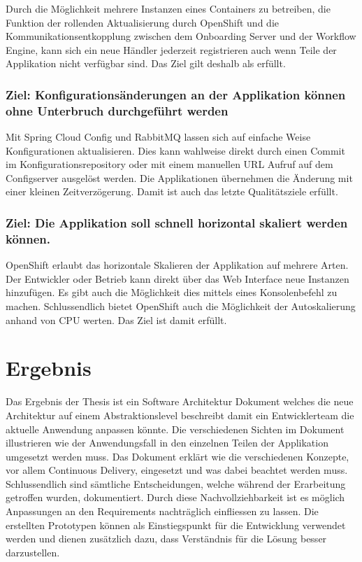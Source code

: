 Durch die Möglichkeit mehrere Instanzen eines Containers zu betreiben, die Funktion der rollenden Aktualisierung durch OpenShift und die Kommunikationsentkopplung zwischen dem Onboarding Server und der Workflow Engine, kann sich ein neue Händler jederzeit registrieren auch wenn Teile
der Applikation nicht verfügbar sind. Das Ziel gilt deshalb als erfüllt.

\subsubsection{Ziel: Konfigurationsänderungen an der Applikation können ohne Unterbruch durchgeführt werden}

Mit Spring Cloud Config und RabbitMQ lassen sich auf einfache Weise Konfigurationen aktualisieren. Dies kann wahlweise direkt durch einen Commit im Konfigurationsrepository oder mit einem manuellen URL Aufruf auf dem Configserver ausgelöst werden. Die Applikationen übernehmen die Änderung mit einer kleinen Zeitverzögerung. Damit ist auch das letzte Qualitätsziele erfüllt.
\newpage

\subsubsection{Ziel: Die Applikation soll schnell horizontal skaliert werden können.}

OpenShift erlaubt das horizontale Skalieren der Applikation auf mehrere Arten. Der Entwickler oder Betrieb kann direkt über das Web Interface neue Instanzen hinzufügen. Es gibt auch die Möglichkeit dies mittels eines Konsolenbefehl zu machen. Schlussendlich bietet OpenShift auch die Möglichkeit der Autoskalierung anhand von CPU werten. Das Ziel ist damit erfüllt.

\section{Ergebnis}

Das Ergebnis der Thesis ist ein Software Architektur Dokument welches die neue Architektur auf einem Abstraktionslevel beschreibt damit ein Entwicklerteam die aktuelle Anwendung anpassen könnte. Die verschiedenen Sichten im Dokument illustrieren wie der Anwendungsfall in den einzelnen Teilen der Applikation umgesetzt werden muss. Das Dokument erklärt wie die verschiedenen Konzepte, vor allem Continuous Delivery, eingesetzt und was dabei beachtet werden muss. Schlussendlich sind sämtliche Entscheidungen, welche während der Erarbeitung getroffen wurden, dokumentiert. Durch diese Nachvollziehbarkeit ist es möglich Anpassungen an den Requirements nachträglich einfliessen zu lassen.\newline
Die erstellten Prototypen können als Einstiegspunkt für die Entwicklung verwendet werden und dienen zusätzlich dazu, dass Verständnis für die Lösung besser darzustellen.
